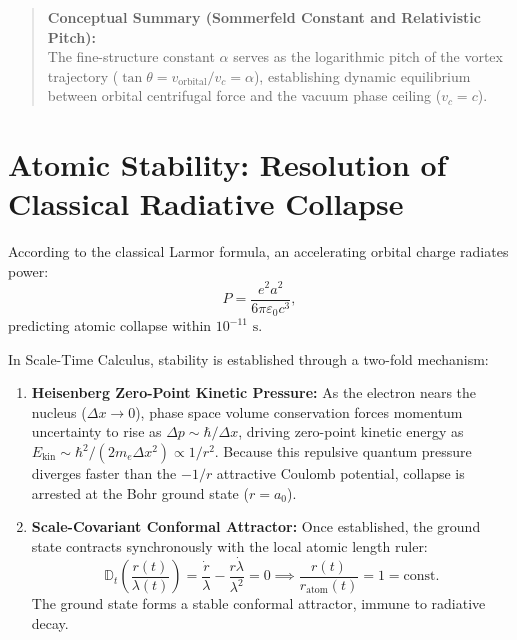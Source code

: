 \documentclass[11pt,a4paper]{article}
\begin{document}
\begin{quote}
    \small
    \textbf{Conceptual Summary (Sommerfeld Constant and Relativistic Pitch):} \\
    The fine-structure constant $\alpha$ serves as the logarithmic pitch of the vortex trajectory ($\tan\theta = v_{\mathrm{orbital}} / v_c = \alpha$), establishing dynamic equilibrium between orbital centrifugal force and the vacuum phase ceiling ($v_c = c$).
\end{quote}

\section{Atomic Stability: Resolution of Classical Radiative Collapse}
\label{sec:atomik_kararlilik}

According to the classical Larmor formula, an accelerating orbital charge radiates power:
\begin{equation}
    P = \frac{e^2 a^2}{6\pi \varepsilon_0 c^3},
    \label{eq:larmor_tr}
\end{equation}
predicting atomic collapse within $10^{-11}\text{ s}$.

In Scale-Time Calculus, stability is established through a two-fold mechanism:
\begin{enumerate}
    \item \textbf{Heisenberg Zero-Point Kinetic Pressure:} As the electron nears the nucleus ($\Delta x \to 0$), phase space volume conservation forces momentum uncertainty to rise as $\Delta p \sim \hbar / \Delta x$, driving zero-point kinetic energy as $E_{\mathrm{kin}} \sim \hbar^2 / (2m_e \Delta x^2) \propto 1/r^2$. Because this repulsive quantum pressure diverges faster than the $-1/r$ attractive Coulomb potential, collapse is arrested at the Bohr ground state ($r = a_0$).
    \item \textbf{Scale-Covariant Conformal Attractor:} Once established, the ground state contracts synchronously with the local atomic length ruler:
          \begin{equation}
              \mathbb{D}_t \left( \frac{r(t)}{\lambda(t)} \right) = \frac{\dot{r}}{\lambda} - \frac{r \dot{\lambda}}{\lambda^2} = 0 \implies \frac{r(t)}{r_{\mathrm{atom}}(t)} = 1 = \text{const}.
              \label{eq:kararlilik_ispat}
          \end{equation}
          The ground state forms a stable conformal attractor, immune to radiative decay.
\end{enumerate}
\end{document}
